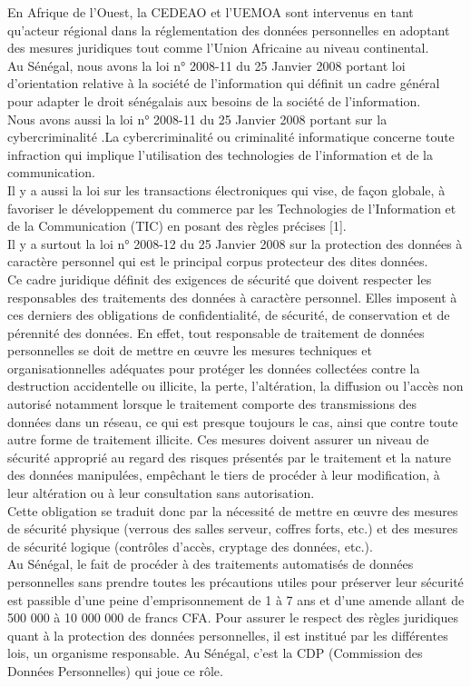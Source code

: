 En Afrique de l’Ouest, la CEDEAO et l’UEMOA  sont intervenus en tant qu’acteur régional dans la réglementation des données personnelles en adoptant des mesures juridiques tout comme l’Union Africaine au niveau continental. \\
Au Sénégal, nous avons la loi n° 2008-11 du 25 Janvier 2008 portant loi d’orientation relative à la société de l’information qui  définit un cadre général pour adapter le droit sénégalais aux besoins de la société de l’information. \\
Nous avons aussi la loi n° 2008-11 du 25 Janvier 2008 portant sur la cybercriminalité .La cybercriminalité ou criminalité informatique concerne toute infraction qui implique l’utilisation des technologies de l'information et de la communication. \\
Il y a aussi la loi sur les transactions électroniques qui vise, de façon globale, à favoriser le développement du commerce par les Technologies de l’Information et de la Communication (TIC) en posant des règles précises [1]. \\
Il y a surtout la loi n° 2008-12 du 25 Janvier 2008 sur la protection des données à caractère personnel qui est le principal corpus protecteur des dites données.\\
Ce cadre juridique définit des exigences de sécurité que doivent respecter les responsables des traitements des données à caractère personnel. Elles imposent à ces derniers des obligations de confidentialité, de sécurité, de conservation et de pérennité des données. En effet, tout responsable de traitement de données personnelles se doit de mettre en œuvre les mesures techniques et organisationnelles adéquates pour protéger les données collectées contre la destruction accidentelle ou illicite, la perte, l’altération, la diffusion ou l’accès non autorisé notamment lorsque le traitement comporte des transmissions des données dans un réseau, ce qui est presque toujours le cas, ainsi que contre toute autre forme de traitement illicite. Ces mesures doivent assurer un niveau de sécurité approprié au regard des risques présentés par le traitement et la nature des données manipulées, empêchant le tiers de procéder à leur modification, à leur altération ou à leur consultation sans autorisation.\\
Cette obligation se traduit donc par la nécessité de mettre en œuvre des mesures de sécurité physique (verrous des salles serveur, coffres forts, etc.) et des mesures de sécurité logique (contrôles d’accès, cryptage des données, etc.).\\
Au Sénégal, le fait de procéder à des traitements automatisés de données personnelles sans prendre toutes les précautions utiles pour préserver leur sécurité est passible d’une peine d’emprisonnement de 1 à 7 ans et d’une amende allant de 500 000 à 10 000 000 de francs CFA.
Pour assurer le respect des règles juridiques quant à la protection des données personnelles, il est institué par les différentes lois, un organisme responsable. Au Sénégal, c’est la CDP (Commission des Données Personnelles) qui joue ce rôle.

